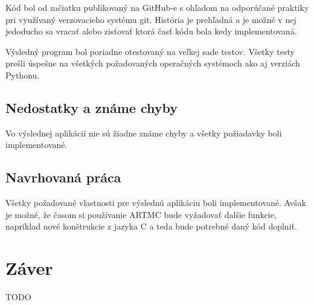 Kód bol od začiatku publikovaný na GitHub-e s ohľadom na odporúčané praktiky pri využívaný verzovacieho systému git. História je prehľadná a je možné v nej jedoducho sa vracať alebo zisťovať ktorá časť kódu bola kedy implementovaná.

Výsledný program bol poriadne otestovaný na veľkej sade testov. Všetky testy prešli úspešne na všetkých požadovaných operačných systémoch ako aj verziách Pythonu.

\section{Nedostatky a známe chyby}
Vo výslednej aplikácií nie sú žiadne známe chyby a všetky požiadavky boli implementované.

\section{Navrhovaná práca}
Všetky požadované vlastnosti pre výslednú aplikáciu boli implementované. Avšak je možné, že časom si používanie ARTMC bude vyžadovať dalšie funkcie, napríklad nové konštrukcie z jazyka C a teda bude potrebné daný kód doplniť. 

\chapter{Záver}
TODO

